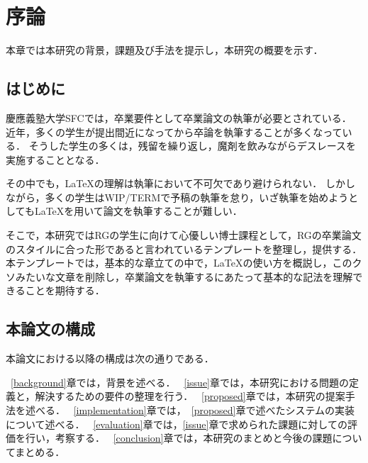 \chapter{序論}
\label{introduction}

本章では本研究の背景，課題及び手法を提示し，本研究の概要を示す．

\section{はじめに}
\label{introduction:background}
慶應義塾大学SFCでは，卒業要件として卒業論文の執筆が必要とされている．
近年，多くの学生が提出間近になってから卒論を執筆することが多くなっている．
そうした学生の多くは，残留を繰り返し，魔剤を飲みながらデスレースを実施することとなる．

その中でも，\LaTeX の理解は執筆において不可欠であり避けられない．
しかしながら，多くの学生はWIP/TERMで予稿の執筆を怠り，いざ執筆を始めようとしても\LaTeX を用いて論文を執筆することが難しい．

そこで，本研究ではRGの学生に向けて心優しい博士課程として，RGの卒業論文のスタイルに合った形であると言われているテンプレートを整理し，提供する．
本テンプレートでは，基本的な章立ての中で，\LaTeX の使い方を概説し，このクソみたいな文章を削除し，卒業論文を執筆するにあたって基本的な記法を理解できることを期待する．

\section{本論文の構成}

本論文における以降の構成は次の通りである．

~\ref{background}章では，背景を述べる．
~\ref{issue}章では，本研究における問題の定義と，解決するための要件の整理を行う．
~\ref{proposed}章では，本研究の提案手法を述べる．
~\ref{implementation}章では，~\ref{proposed}章で述べたシステムの実装について述べる．
~\ref{evaluation}章では，\ref{issue}章で求められた課題に対しての評価を行い，考察する．
~\ref{conclusion}章では，本研究のまとめと今後の課題についてまとめる．


